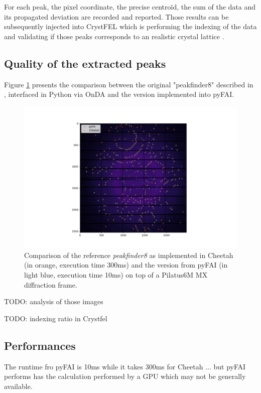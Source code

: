 \documentclass[a4paper,12pt,oneside]{article}              %
\newcommand{\citeasnoun}{\citet}
\begin{document}
For each peak, the pixel coordinate, the precise centroïd, the sum of the data and its propagated deviation are recorded and reported. 
Those results can be subsequently injected into CrystFEL \cite{CrystFEL} which is performing the indexing of
the data and validating if those peaks corresponds to an realistic crystal lattice \cite{nanopeakcell}.


\subsection{Quality of the extracted peaks}
Figure \ref{peakfinder} presents the comparison between the original "peakfinder8" described in \citeasnoun{Cheetah2014}, interfaced in Python via OnDA \cite{onda} and the version implemented into pyFAI. 

\begin{figure}
\label{peakfinder}
\begin{center}
\includegraphics[width=12cm]{peakfinder}
\caption{Comparison of the reference \textit{peakfinder8} as implemented in Cheetah (in orange, execution time 300ms) and the version from pyFAI (in light blue, execution time 10ms) on top of a Pilatus6M MX diffraction frame.}
\end{center}
\end{figure}

TODO: analysis of those images 

TODO: indexing ratio in Crystfel

\subsection{Performances}
The runtime fro pyFAI is 10ms while it takes 300ms for Cheetah ... but pyFAI performs has the calculation performed by a GPU which may not be generally available.
\end{document}
